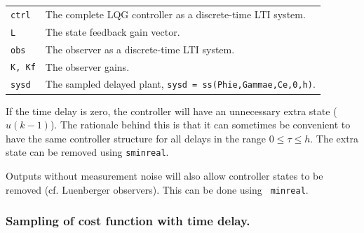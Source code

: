 \documentclass[final,twoside]{rapport}  %
\begin{document}
\retvals
\begin{tabularx}{\hsize}{l>{\raggedright\arraybackslash}X}
{\tt ctrl} & The complete LQG controller as a discrete-time LTI system.\\
{\tt L} & The state feedback gain vector.\\
{\tt obs} & The observer as a discrete-time LTI system.\\
{\tt K, Kf} & The observer gains.\\
{\tt sysd} & The sampled delayed plant, {\tt sysd = ss(Phie,Gammae,Ce,0,h)}.
\end{tabularx}

\remark

If the time delay is zero, the controller will have an unnecessary
extra state ($u(k-1)$). The rationale behind this is that it
can sometimes be convenient to have the same controller structure for
all delays in the range $0 \leq \tau \leq h$. The extra state can be
removed using {\tt sminreal}.

Outputs without measurement noise will also allow controller states to
be removed (cf. Luenberger observers). This can be done using {\tt
  minreal}.

\theory 

\subsubsection{Sampling of cost function with time delay.}
\end{document}
